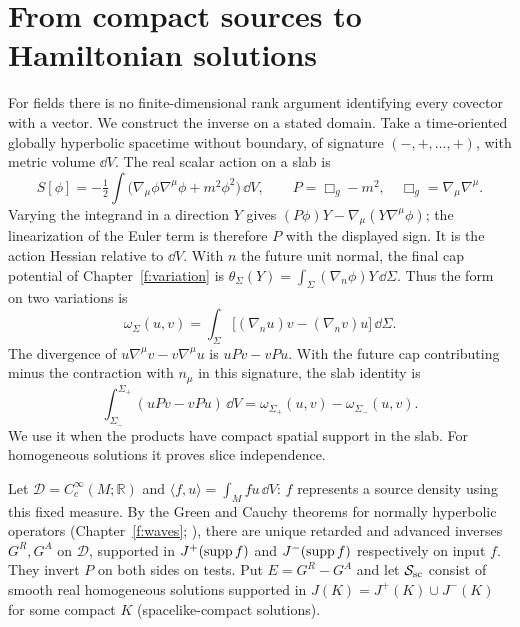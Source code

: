 \section{From compact sources to Hamiltonian solutions}
For fields there is no finite-dimensional rank argument identifying every covector with a vector. We construct the inverse on a stated domain. Take a time-oriented globally hyperbolic spacetime without boundary, of signature $(-,+,\ldots,+)$, with metric volume $\dd V$. The real scalar action on a slab is
\[
 S[\phi]=-\tfrac12\int\big(\nabla_\mu\phi\nabla^\mu\phi+m^2\phi^2\big)\,\dd V,
 \qquad P=\Box_g-m^2,\quad \Box_g=\nabla_\mu\nabla^\mu .
\]
Varying the integrand in a direction $Y$ gives $(P\phi)Y-\nabla_\mu(Y\nabla^\mu\phi)$; the linearization of the Euler term is therefore $P$ with the displayed sign. It is the action Hessian relative to $\dd V$. With $n$ the future unit normal, the final cap potential of Chapter~\ref{f:variation} is $\theta_\Sigma(Y)=\int_\Sigma(\nabla_n\phi)Y\,\dd\Sigma$. Thus the form on two variations is
\[
 \omega_\Sigma(u,v)=\int_\Sigma\big[(\nabla_n u)v-(\nabla_n v)u\big]\,\dd\Sigma .
\]
The divergence of $u\nabla^\mu v-v\nabla^\mu u$ is $uPv-vPu$. With the future cap contributing minus the contraction with $n_\mu$ in this signature, the slab identity is
\begin{equation}
 \int_{\Sigma_-}^{\Sigma_+}(uPv-vPu)\,\dd V
       =\omega_{\Sigma_+}(u,v)-\omega_{\Sigma_-}(u,v).
 \label{f:observable-green}
\end{equation}
We use it when the products have compact spatial support in the slab. For homogeneous solutions it proves slice independence.

Let $\mathcal D=C_c^\infty(M;\mathbb R)$ and $\langle f,u\rangle=\int_M fu\,\dd V$: $f$ represents a source density using this fixed measure. By the Green and Cauchy theorems for normally hyperbolic operators (Chapter~\ref{f:waves}; \cite{BGP}), there are unique retarded and advanced inverses $G^R,G^A$ on $\mathcal D$, supported in $J^+(\operatorname{supp} f)$ and $J^-(\operatorname{supp} f)$ respectively on input $f$. They invert $P$ on both sides on tests. Put $E=G^R-G^A$ and let $\mathcal S_{\rm sc}$ consist of smooth real homogeneous solutions supported in $J(K)=J^+(K)\cup J^-(K)$ for some compact $K$ (spacelike-compact solutions).


